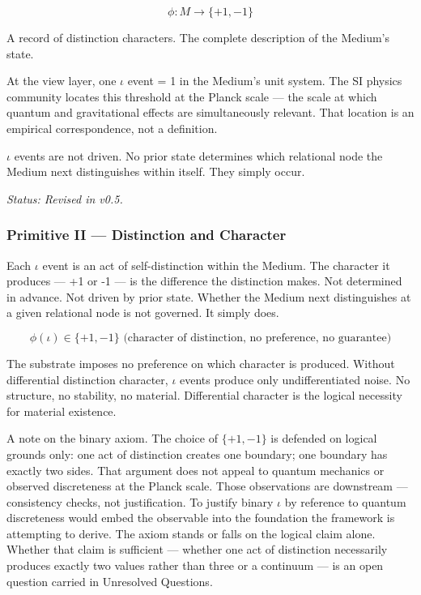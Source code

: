 \documentclass[11pt,letterpaper]{article}
\begin{document}
\begin{equation}
\phi : M \to \{+1, -1\}
\end{equation}

\begin{center}
A record of distinction characters. The complete description of the Medium's state.
\end{center}

At the view layer, one \(\iota\) event = 1 in the Medium's unit system. The SI physics community locates this threshold at the Planck scale --- the scale at which quantum and gravitational effects are simultaneously relevant. That location is an empirical correspondence, not a definition.

\(\iota\) events are not driven. No prior state determines which relational node the Medium next distinguishes within itself. They simply occur.

\emph{Status: Revised in v0.5.}

\subsubsection{Primitive II --- Distinction and Character}
\label{sec:org1af1839}


Each \(\iota\) event is an act of self-distinction within the Medium. The character it produces --- +1 or -1 --- is the difference the distinction makes. Not determined in advance. Not driven by prior state. Whether the Medium next distinguishes at a given relational node is not governed. It simply does.

\begin{equation}
\phi(\iota) \in \{+1, -1\} \text{ (character of distinction, no preference, no guarantee)}
\end{equation}

The substrate imposes no preference on which character is produced. Without differential distinction character, \(\iota\) events produce only undifferentiated noise. No structure, no stability, no material. Differential character is the logical necessity for material existence.

A note on the binary axiom. The choice of \(\{+1, -1\}\) is defended on logical grounds only: one act of distinction creates one boundary; one boundary has exactly two sides. That argument does not appeal to quantum mechanics or observed discreteness at the Planck scale. Those observations are downstream --- consistency checks, not justification. To justify binary \(\iota\) by reference to quantum discreteness would embed the observable into the foundation the framework is attempting to derive. The axiom stands or falls on the logical claim alone. Whether that claim is sufficient --- whether one act of distinction necessarily produces exactly two values rather than three or a continuum --- is an open question carried in Unresolved Questions.
\end{document}
